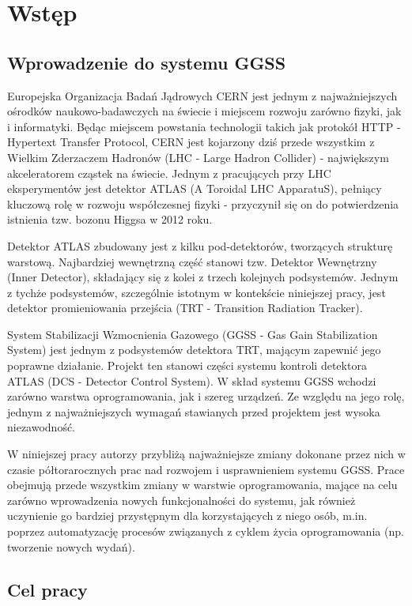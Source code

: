 \chapter{Wstęp}
\label{cha:wstep}

\section{Wprowadzenie do systemu GGSS}

Europejska Organizacja Badań Jądrowych CERN jest jednym z najważniejszych ośrodków naukowo-badawczych na świecie i miejscem rozwoju zarówno fizyki, jak i informatyki. Będąc miejscem powstania technologii takich jak protokół HTTP - Hypertext Transfer Protocol, CERN jest kojarzony dziś przede wszystkim z Wielkim Zderzaczem Hadronów (LHC - Large Hadron Collider) - największym akceleratorem cząstek na świecie. Jednym z pracujących przy LHC eksperymentów jest detektor ATLAS (A Toroidal LHC ApparatuS), pełniący kluczową rolę w rozwoju współczesnej fizyki - przyczynił się on do potwierdzenia istnienia tzw. bozonu Higgsa w 2012 roku. 

Detektor ATLAS zbudowany jest z kilku pod-detektorów, tworzących strukturę warstową. Najbardziej wewnętrzną część stanowi tzw. Detektor Wewnętrzny (Inner Detector), składający się z kolei z trzech kolejnych podsystemów. Jednym z tychże podsystemów, szczególnie istotnym w kontekście niniejszej pracy, jest detektor promieniowania przejścia (TRT - Transition Radiation Tracker). 

System Stabilizacji Wzmocnienia Gazowego (GGSS - Gas Gain Stabilization System) jest jednym z podsystemów detektora TRT, mającym zapewnić jego poprawne działanie. Projekt ten stanowi części systemu kontroli detektora ATLAS (DCS - Detector Control System). W skład systemu GGSS wchodzi zarówno warstwa oprogramowania, jak i szereg urządzeń. Ze względu na jego rolę, jednym z najważniejszych wymagań stawianych przed projektem jest wysoka niezawodność.

W niniejszej pracy autorzy przybliżą najważniejsze zmiany dokonane przez nich w czasie półtorarocznych prac nad rozwojem i usprawnieniem systemu GGSS. Prace obejmują przede wszystkim zmiany w warstwie oprogramowania, mające na celu zarówno wprowadzenia nowych funkcjonalności do systemu, jak również uczynienie go bardziej przystępnym dla korzystających z niego osób, m.in. poprzez automatyzację procesów związanych z cyklem życia oprogramowania (np. tworzenie nowych wydań).


\section{Cel pracy}


